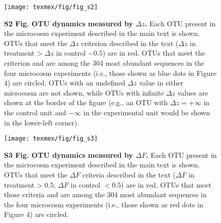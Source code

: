 \clearpage
\begin{figure}[ht]
\centering
\texttt{[image: texmex/fig/fig\_s2]}
\caption*{{\bf S2 Fig. OTU dynamics measured by $\Delta z$.}
Each OTU present in the microcosm experiment described in the main text is
shown. OTUs that meet the $\Delta z$ criterion described in the text ($\Delta z$ in treatment >
$\Delta z$ in control $- 0.5$) are in red. OTUs that meet the criterion and are among
the 304 most abundant sequences in the four microcosm experiments (i.e., those
shown as blue dots in Figure 4) are circled. OTUs with an undefined $\Delta z$ value in
either microcosm are not shown, while OTUs with infinite $\Delta z$ values are shown at
the border of the figure (e.g., an OTU with $\Delta z = +\infty$ in the control unit and $-\infty$
in the experimental unit would be shown in the lower-left corner).}
\end{figure}

\clearpage
\begin{figure}[ht]
\centering
\texttt{[image: texmex/fig/fig\_s3]}
\caption*{{\bf S3 Fig. OTU dynamics measured by $\Delta F$.}
Each OTU present in the microcosm experiment described in the main text is
shown. OTUs that meet the $\Delta F$ criteria described in the text ($\Delta F$ in treatment >
0.5; $\Delta F$ in control $< 0.5$) are in red. OTUs that meet those criteria and are
among the 304 most abundant sequences in the four microcosm experiments (i.e.,
those shown as red dots in Figure 4) are circled.}
\end{figure}
